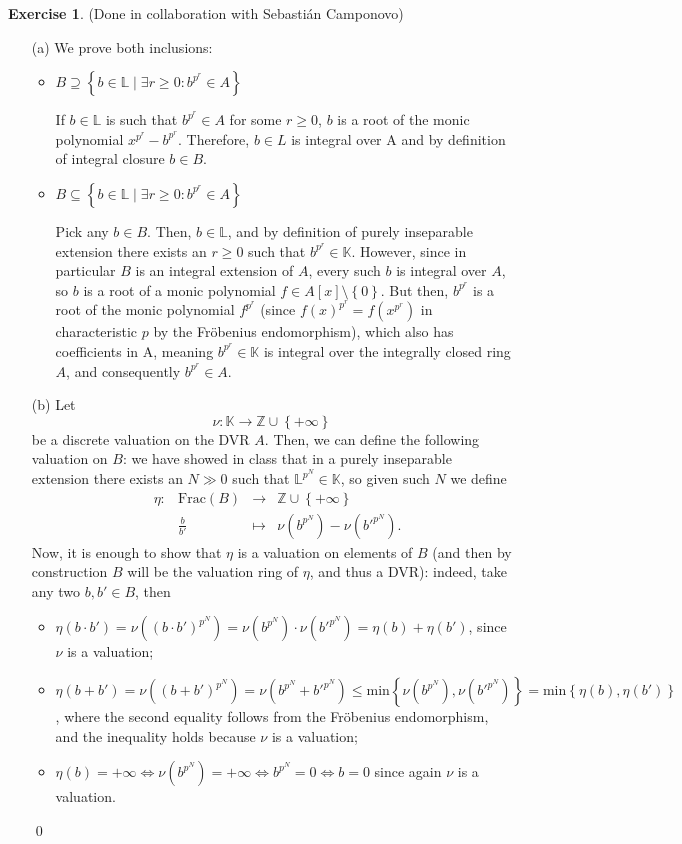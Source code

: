 \documentclass[a4paper]{article}
\newcommand{\K}{\mathbb{K}}
\newcommand{\Z}{\mathbb{Z}}
\theoremstyle{definition}
\theoremstyle{definition}
\theoremstyle{remark}
\theoremstyle{definition}
\newtheorem{exercise}{Exercise}[section]
\begin{document}
\begin{exercise}(Done in collaboration with Sebastián Camponovo)\


\begin{itemize}
	\item[(a)] We prove both inclusions:
	\begin{itemize}
	\item $B\supseteq\left\{ b\in \mathbb{L} \mid \exists r\geq 0:b^{p^r}\in A \right\} $

		If $b\in \mathbb{L}$ is such that $b^{p^r}\in A$ for some  $r\geq 0$, $b$ is a root of the monic polynomial $x^{p^r}-b^{p^r}$. Therefore, $b\in L$ is integral over A and by
		definition of integral closure $b\in B$.
	\item $B\subseteq\left\{ b\in \mathbb{L} \mid \exists r\geq 0:b^{p^r}\in A \right\} $

		Pick any $b\in B$. Then, $b\in \mathbb{L}$, and by definition of purely inseparable extension there exists an $r\geq 0$ such that $b^{p^r}\in \K$. However, since in
		particular $B$ is an integral extension of $A$, every such $b$ is integral over $A$, so $b$ is a root of a monic polynomial $f\in A[x]\setminus\left\{ 0 \right\}
		$. But then, $b^{p^r}$ is a root of the monic
		polynomial $f^{p^r}$ (since $f(x)^{p^r}=f(x^{p^r})$ in characteristic $p$ by the Fröbenius endomorphism), which also has coefficients in A, meaning $b^{p^r}\in\K$ is integral over the integrally closed ring $A$, and consequently $b^{p^r}\in A$.
	\end{itemize}
	\item[(b)] Let $$\nu: \K\to\Z\cup\left\{ +\infty \right\} $$ be a discrete valuation on the DVR $A$. Then, we can define the following valuation on $B$: we have showed in
		class that in a purely inseparable extension there exists an $N\gg 0$ such that $\mathbb{L}^{p^N}\in\K$, so given such $N$ we define
		\[
			\begin{array}{ccccc}
				&\eta:&\text{Frac}\left( B \right) &\longrightarrow&\Z\cup\left\{ +\infty \right\}\\
				     &&\displaystyle\frac{b}{b'}&\longmapsto&\nu{(b^{p^N})}-\nu{(b'^{p^N})}.
			\end{array}
		\]
		Now, it is enough to show that $\eta$ is a valuation on elements of $B$ (and then by construction $B$ will be the valuation ring of $\eta$, and thus a DVR):
		indeed, take any two $b,b'\in B$, then
		\begin{itemize}
			\item $\eta(b\cdot b')=\nu((b\cdot b')^{p^N})=\nu(b^{p^N})\cdot\nu(b'^{p^N})=\eta(b)+\eta(b')$, since $\nu$ is a valuation;
			\item $\eta(b+
			b')=\nu((b+b')^{p^N})=\nu(b^{p^N}+{b'}^{p^N})\leq\text{min}{\left\{\nu(b^{p^N}),\nu(b'^{p^N})\right\}}=\text{min}{\left\{\eta(b),\eta(b')\right\}}$, where the second equality follows from the Fröbenius
				endomorphism, and the inequality holds because $\nu$ is a valuation;
			\item $\eta(b)=+\infty\iff\nu(b^{p^N})=+\infty\iff b^{p^N}=0\iff b=0$ since again $\nu$ is a valuation.
		\end{itemize}
		\qed
\end{itemize}
\end{exercise}
\end{document}
